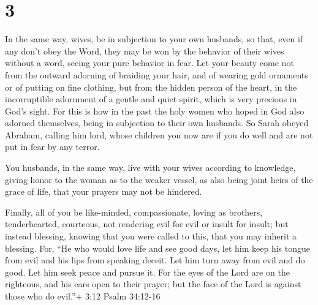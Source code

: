 \hypertarget{section-2}{%
\section{3}\label{section-2}}

 In the same way, wives, be in subjection to your own
husbands, so that, even if any don't obey the Word, they may be won by
the behavior of their wives without a word,  seeing your
pure behavior in fear.  Let your beauty come not from the
outward adorning of braiding your hair, and of wearing gold ornaments or
of putting on fine clothing,  but from the hidden person of
the heart, in the incorruptible adornment of a gentle and quiet spirit,
which is very precious in God's sight.  For this is how in
the past the holy women who hoped in God also adorned themselves, being
in subjection to their own husbands.  So Sarah obeyed
Abraham, calling him lord, whose children you now are if you do well and
are not put in fear by any terror.

 You husbands, in the same way, live with your wives
according to knowledge, giving honor to the woman as to the weaker
vessel, as also being joint heirs of the grace of life, that your
prayers may not be hindered.

 Finally, all of you be like-minded, compassionate, loving
as brothers, tenderhearted, courteous,  not rendering evil
for evil or insult for insult; but instead blessing, knowing that you
were called to this, that you may inherit a blessing.  For,
``He who would love life and see good days, let him keep his tongue from
evil and his lips from speaking deceit.  Let him turn away
from evil and do good. Let him seek peace and pursue it. 
For the eyes of the Lord are on the righteous, and his ears open to
their prayer; but the face of the Lord is against those who do evil.''+
3:12 Psalm 34:12-16

